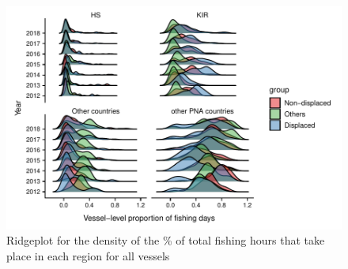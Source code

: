 \documentclass[9p,twocolumn,twoside,lineno]{pnas-new}
\begin{document}
\begin{figure}[H]
\centering
	\includegraphics{img/yearly_distribution_prop_fishing_by_region.pdf}
	\caption{\label{fig:yearly_distribution_prop_fishing_by_region}Ridgeplot for the density of the \% of total fishing hours that take place in each region for all vessels}	
\end{figure}
\end{document}
